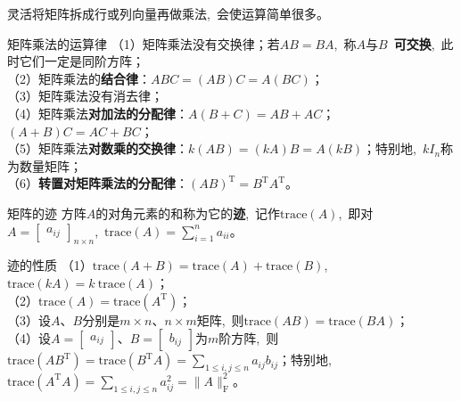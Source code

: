 \documentclass[10pt, a4paper, oneside, fontset=none]{ctexart}
\theoremstyle{plain}
\theoremstyle{definition}
\newcommand{\com}{,\,\,\,\:}
\newcommand{\colors}[1]{\color{#1!75!black}}
\newcommand{\de}[2][]{\begin{defil}{#1}\kai #2\end{defil}}
\newcommand{\di}[2][]{\begin{theo}{#1}\run #2\end{theo}}
\newcommand{\tboba}[1]{\textbf{\kai\color{bali!75!black}#1}}
\newcommand{\tbome}[1]{\textbf{\run\color{meihong!75!black}#1}}
\begin{document}
灵活将矩阵拆成行或列向量再做乘法\com 会使运算简单很多。
\di[矩阵乘法的运算律]{
    （1）矩阵乘法{\colors{meihong}没有交换律}；若$AB=BA$\com 称$A$与$B$~\tbome{可交换}\com 此时它们一定是同阶方阵；\\
    （2）矩阵乘法的\tbome{结合律}：$ABC=(AB)C=A(BC)$；\\
    （3）矩阵乘法{\colors{meihong}没有消去律}；\\
    （4）矩阵乘法\tbome{对加法的分配律}：$A(B+C)=AB+AC$；$(A+B)C=AC+BC$；\\
    （5）矩阵乘法\tbome{对数乘的交换律}：$k(AB)=(kA)B=A(kB)$；特别地\com $kI_n$称为{\colors{meihong}数量矩阵}；\\
    （6）\tbome{转置对矩阵乘法的分配律}：$(AB)^\mathrm{T}=B^\mathrm{T}A^\mathrm{T}$。
}
\de[矩阵的迹]{
    方阵$A$的对角元素的和称为它的\tboba{迹}\com 记作$\mathrm{trace}(A)$\com 即对$A=\begin{bmatrix}
        a_{ij}
    \end{bmatrix}_{n\times n}$\com $\mathrm{trace}(A)=\sum\limits_{i=1}^{n}a_{ii}$。
}
\di[迹的性质]{
    （1）$\mathrm{trace}(A+B)=\mathrm{trace}(A)+\mathrm{trace}(B)$\com $\mathrm{trace}(kA)=k~\mathrm{trace}(A)$；\\
    （2）$\mathrm{trace}(A)=\mathrm{trace}(A^{\mathrm{T}})$；\\
    （3）设$A$、$B$分别是$m\times n$、$n\times m$矩阵\com 则$\mathrm{trace}(AB)=\mathrm{trace}(BA)$；\\
    （4）设$A=\begin{bmatrix}
        a_{ij}
    \end{bmatrix}$、$B=\begin{bmatrix}
        b_{ij}
    \end{bmatrix}$为$m$阶方阵\com 则$\mathrm{trace}(AB^\mathrm{T})=\mathrm{trace}(B^\mathrm{T}A)=\sum\limits_{1\le i,j\le n}a_{ij}b_{ij}$；特别地\com $\mathrm{trace}(A^\mathrm{T}A)=\sum\limits_{1\le i,j\le n}a_{ij}^2=\|A\|_\mathrm{F}^2$。
}
\end{document}

